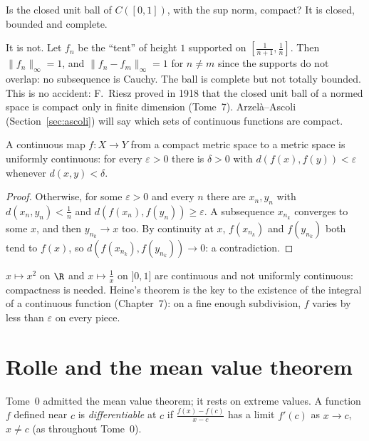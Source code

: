 \begin{think}
Is the closed unit ball of $C([0,1])$, with the sup norm, compact? It is closed, bounded and complete.
\end{think}

It is not. Let $f_n$ be the ``tent'' of height $1$ supported on $[\frac1{n+1},\frac1n]$. Then $\|f_n\|_\infty=1$, and $\|f_n-f_m\|_\infty=1$ for $n\ne m$ since the supports do not overlap:
no subsequence is Cauchy. The ball is complete but not totally bounded. This is no accident: F.~Riesz proved in 1918 that the closed unit
ball of a normed space is compact only in finite dimension (Tome~7). Arzel\`a--Ascoli (Section~\ref{sec:ascoli}) will say which sets of continuous
functions are compact.

\begin{theorem}[Heine]\label{thm:heine}
A continuous map $f:X\to Y$ from a compact metric space to a metric space is uniformly continuous: for every $\varepsilon>0$ there is $\delta>0$ with
$d(f(x),f(y))<\varepsilon$ whenever $d(x,y)<\delta$.
\end{theorem}
\begin{proof}
Otherwise, for some $\varepsilon>0$ and every $n$ there are $x_n,y_n$ with $d(x_n,y_n)<\frac1n$ and $d(f(x_n),f(y_n))\ge\varepsilon$. A subsequence $x_{n_k}$ converges to some $x$, and then
$y_{n_k}\to x$ too. By continuity at $x$, $f(x_{n_k})$ and $f(y_{n_k})$ both tend to $f(x)$, so $d(f(x_{n_k}),f(y_{n_k}))\to0$: a contradiction.
\end{proof}

$x\mapsto x^2$ on $\R$ and $x\mapsto\frac1x$ on $]0,1]$ are continuous and not uniformly continuous: compactness is needed. Heine's theorem is the key to
the existence of the integral of a continuous function (Chapter~7): on a fine enough subdivision, $f$ varies by less than $\varepsilon$ on every piece.

\section{Rolle and the mean value theorem}

Tome~0 admitted the mean value theorem; it rests on extreme values. A function $f$ defined near $c$ is \emph{differentiable} at $c$ if
$\frac{f(x)-f(c)}{x-c}$ has a limit $f'(c)$ as $x\to c$, $x\ne c$ (as throughout Tome~0).

